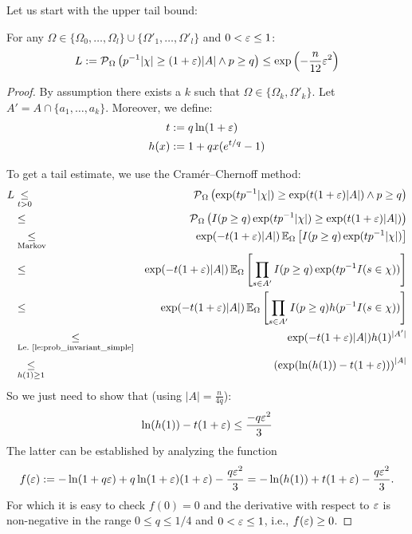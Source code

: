 Let us start with the upper tail bound:
\begin{lemma}
\label{le:upper_tail}
For any $\Omega \in \{\Omega_0,\ldots,\Omega_l\} \cup \{\Omega'_1,\ldots,\Omega'_l\}$ and
$0 < \varepsilon \leq 1$:
\[
L := \operatorname{\mathcal P}_{\Omega} \left( p^{-1} |\chi| \geq (1+\varepsilon) |A| \wedge p \geq q\right) \leq
  \exp\left(-\frac{n}{12} \varepsilon^2\right)
\]
\end{lemma}
\begin{proof}
By assumption there exists a $k$ such that $\Omega \in \{\Omega_k, \Omega'_k\}$.
Let $A' = A \cap \{a_1,\ldots,a_k\}$.
Moreover, we define:
\begin{align*}
  t & := q \ln( 1 + \varepsilon) \\
  h(x) & := 1+qx(e^{t/q}-1)  
\end{align*}

To get a tail estimate, we use the Cram\'{e}r--Chernoff method:
{\allowdisplaybreaks
\begin{eqnarray*}
  L & \underset{t > 0}{\leq} & \operatorname{\mathcal P}_{\Omega} \left( \exp(t p^{-1} |\chi|) \geq
    \exp(t (1+\varepsilon) |A|) \wedge p \geq q \right) \\
  & \leq &
    \operatorname{\mathcal P}_{\Omega} \left( I(p \geq q) \exp(t p^{-1} |\chi|) \geq \exp(t (1+\varepsilon) |A|) \right) \\
  & \underset{\textrm{Markov}}{\leq} &
    \exp( -t (1+\varepsilon) |A| ) \operatorname{\mathbb E}_\Omega \left[ I(p \geq q) \exp ( t p^{-1} |\chi| ) \right] \\
 & \leq & \exp( -t (1+\varepsilon) |A| ) 
  \operatorname{\mathbb E}_\Omega \left[ \prod_{s \in A'} I(p \geq q) \exp ( t p^{-1} I(s \in \chi) ) \right] \\
 & \leq & \exp( -t (1+\varepsilon) |A| ) 
  \operatorname{\mathbb E}_\Omega \left[ \prod_{s \in A'} I(p \geq q) h( p^{-1} I(s \in \chi) ) \right] \\
 & \underset{\textrm{Le.~\ref{le:prob_invariant_simple}}}{\leq} & \exp( -t (1+\varepsilon) |A| ) h(1)^{|A'|} \\
 & \underset{h(1)\geq 1}{\leq} & \left(\exp( \ln(h(1)) -t (1+\varepsilon))\right) ^ {|A|} 
\end{eqnarray*}}
So we just need to show that (using $|A|=\frac{n}{4q}$):
\[
  \ln(h(1))-t (1+\varepsilon) \leq \frac{-q \varepsilon^2}{3}
\]
The latter can be established by analyzing the function
\[
  f(\varepsilon) := -\ln(1+q \varepsilon) + q \ln(1+\varepsilon) (1+\varepsilon) - \frac{q \varepsilon^2}{3} =
    -\ln (h(1)) +t (1+\varepsilon) - \frac{q\varepsilon^2}{3} \textrm{.}
\]
For which it is easy to check $f(0) = 0$ and the derivative with respect to $\varepsilon$ is non-negative
in the range $0 \leq q \leq 1/4$ and $0 < \varepsilon \leq 1$, i.e., $f(\varepsilon) \geq 0$.
\end{proof}

